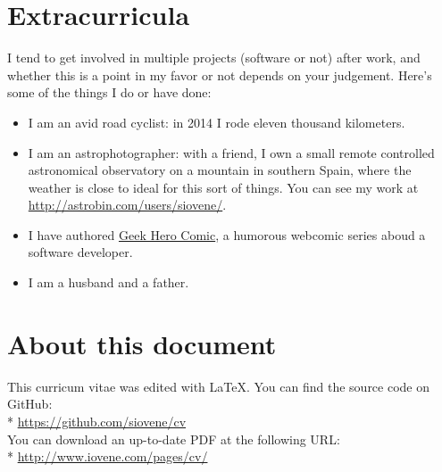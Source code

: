\documentclass[10pt]{tccv}
\begin{document}
		\section{Extracurricula}
			I tend to get involved in multiple projects (software or not) after
			work, and whether this is a point in my favor or not depends on
			your judgement. Here's some of the things I do or have done:

			\begin{itemize}
				\item I am an avid road cyclist: in 2014 I rode eleven thousand
					kilometers.
				\item I am an astrophotographer: with a friend, I own a small
					remote controlled astronomical observatory on a mountain in
					southern Spain, where the weather is close to ideal for
					this sort of things. You can see my work at
					\url{http://astrobin.com/users/siovene/}.
				\item I have authored \href{http://www.geekherocomic.com}{Geek
					Hero Comic}, a humorous webcomic series aboud a software
					developer.
				\item I am a husband and a father.
			\end{itemize}


		\section{About this document}
			This curricum vitae was edited with \LaTeX. You can find the source
			code on GitHub:\\*
			\url{https://github.com/siovene/cv}\\

			You can download an up-to-date PDF at the following URL:\\*
			\url{http://www.iovene.com/pages/cv/}\\
\end{document}
